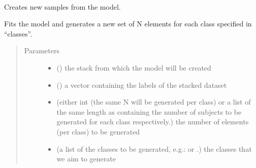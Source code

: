 \documentclass[letterpaper,10pt,english]{sphinxmanual}
\begin{document}

\begin{fulllineitems}
\label{\detokenize{index:brainSimulator.BrainSimulator}}~

\begin{fulllineitems}
\label{\detokenize{index:brainSimulator.BrainSimulator.createNewBrains}}
Creates new samples from the model.

\end{fulllineitems}


\begin{fulllineitems}
\label{\detokenize{index:brainSimulator.BrainSimulator.generateDataset}}
Fits the model and generates a new set of N elements for each class
specified in “classes”.
\begin{quote}\begin{description}
\item[{Parameters}] \leavevmode\begin{itemize}
\item {} 
 () \textendash{} the stack from which the model will be created

\item {} 
 () \textendash{} a vector containing the labels of the stacked dataset

\item {} 
 (either int (the same N will be generated per class) or a list of the same length as  containing the number of subjects to be generated for each class respectively.) \textendash{} the number of elements (per class) to be generated

\item {} 
 (a list of the classes to be generated, e.g.: \sphinxtitleref{{[}0, 2{]}} or \sphinxtitleref{{[}‘AD’, ‘CTL’{]}}.) \textendash{} the classes that we aim to generate


\end{itemize}
\end{description}
\end{quote}
\end{fulllineitems}
\end{fulllineitems}
\end{document}
